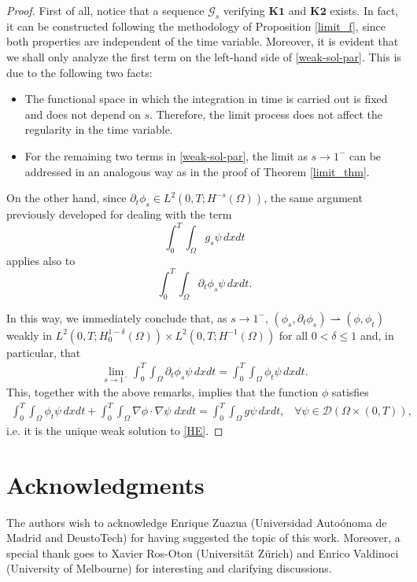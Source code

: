 \documentclass[reqno,twoside]{amsart}
\numberwithin{equation}{section}
\begin{document}
\begin{proof}
First of all, notice that a sequence $\mathcal{G}_s$ verifying $\textbf{K1}$ and $\textbf{K2}$ exists. In fact, it can be constructed following the methodology of Proposition \ref{limit_f}, since both properties are independent of the time variable. Moreover, it is evident that we shall only analyze  the first term on the left-hand side of \eqref{weak-sol-par}. This is due to the following two facts:
\begin{itemize}
	\item The functional space in which the integration in time is carried out is fixed and does not depend on $s$. Therefore, the limit process does not affect the regularity in the time variable.
	
	\item For the remaining two terms in \eqref{weak-sol-par}, the limit as $s\to 1^-$ can be addressed in an analogous way as in the proof of Theorem \ref{limit_thm}.
\end{itemize}

On the other hand, since $\partial_t\phi_s\in L^2(0,T;H^{-s}(\Omega))$, the same argument previously developed for dealing with the term 
\begin{equation*}
	\int_0^T\int_\Omega g_s\psi\,dxdt
\end{equation*}
applies also to
\begin{equation*}
	\int_0^T\int_{\Omega} \partial_t\phi_s\psi\,dxdt.
\end{equation*}

In this way, we immediately conclude that, as $s\to 1^-$, $(\phi_s,\partial_t\phi_s)\rightharpoonup (\phi,\phi_t)$ weakly in $L^2(0,T;H^{1-\delta}_0(\Omega))\times L^2(0,T;H^{-1}(\Omega))$ for all $0<\delta\leq 1$ and, in particular, that 
\begin{align*}
	\lim_{s\to 1^-}\int_0^T\int_{\Omega} \partial_t\phi_s\psi\,dxdt = \int_0^T\int_{\Omega} \phi_t\psi\,dxdt.
\end{align*}
This, together with the above remarks, implies that the function $\phi$ satisfies
\begin{align*}
	\int_0^T \int_\Omega\phi_t\psi\,dxdt + \int_0^T\int_\Omega \nabla\phi\cdot\nabla\psi\;dxdt = \int_0^T\int_\Omega g\psi\,dxdt, \;\;\; \forall\psi\in\mathcal{D}(\Omega\times(0,T)),
\end{align*}
i.e. it is the unique weak solution to \eqref{HE}.
\end{proof}

\section*{Acknowledgments}

The authors wish to acknowledge Enrique Zuazua (Universidad Auto\'onoma de Madrid and DeustoTech) for having suggested the topic of this work. Moreover, a special thank goes to Xavier Ros-Oton (Universit\"at Z\"urich) and Enrico Valdinoci (University of Melbourne) for interesting and clarifying discussions.

\end{document}
